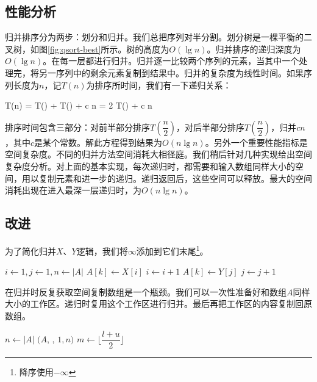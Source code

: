 \documentclass[b5paper]{ctexart}
\begin{document}
\subsection{性能分析}

归并排序分为两步：划分和归并。我们总把序列对半分割。划分树是一棵平衡的二叉树，如图\cref{fig:qsort-best}所示。树的高度为$O(\lg n)$。归并排序的递归深度为$O(\lg n)$。在每一层都进行归并。归并逐一比较两个序列的元素，当其中一个处理完，将另一序列中的剩余元素复制到结果中。归并的复杂度为线性时间。如果序列长度为$n$，记$T(n)$为排序所时间，我们有一下递归关系：

\be
T(n) = T() + T() + c n = 2 T() + c n
\ee

排序时间包含三部分：对前半部分排序$T(\dfrac{n}{2})$，对后半部分排序$T(\dfrac{n}{2})$，归并$c n$，其中$c$是某个常数。解此方程得到结果为$O(n \lg n)$。另外一个重要性能指标是空间复杂度。不同的归并方法空间消耗大相径庭。我们稍后针对几种实现给出空间复杂度分析。对上面的基本实现，每次递归时，都需要和输入数组同样大小的空间，用以复制元素和进一步的递归。递归返回后，这些空间可以释放。最大的空间消耗出现在进入最深一层递归时，为$O(n \lg n)$。

\subsection{改进}

为了简化归并$X$、$Y$逻辑，我们将$\infty$添加到它们末尾\footnote{降序使用$-\infty$}。

\begin{algorithmic}[1]
  \State {}
  \State {}
  \State $i \gets 1, j\gets 1, n \gets |A|$
      \State $A[k] \gets X[i]$
      \State $i \gets i + 1$
    \Else
      \State $A[k] \gets Y[j]$
      \State $j \gets j + 1$
    \EndIf
  \EndFor
\EndProcedure
\end{algorithmic}

在归并时反复获取空间复制数组是一个瓶颈\cite{Bentley}。我们可以一次性准备好和数组$A$同样大小的工作区。递归时复用这个工作区进行归并。最后再把工作区的内容复制回原数组。

\begin{algorithmic}[1]
  \State $n \gets |A|$
  \State {}$(A$, , $1, n)$
\EndProcedure
\Statex
{}
    \State $m \gets \lfloor \dfrac{l + u}{2} \rfloor$
    \State {}
    \State {}
    \State {}
  \EndIf
\EndProcedure
\end{algorithmic}
\end{document}
